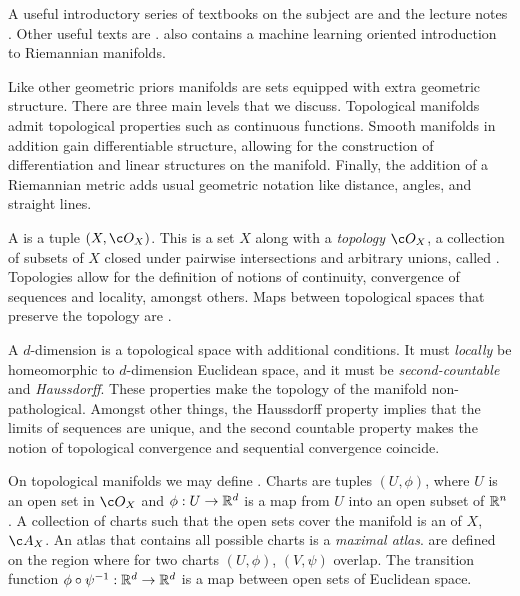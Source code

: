 A useful introductory series of textbooks on the subject are \textcite{lee2010introduction,lee2013smooth,lee2006riemannian} and the lecture notes \textcite{schuller2013lectures}. Other useful texts are \textcite{kolar2013natural, thorne2000gravitation}. \textcite{bronstein2021geometric} also contains a machine learning oriented introduction to Riemannian manifolds.

Like other geometric priors manifolds are sets equipped with extra geometric structure.
There are three main levels that we discuss.
Topological manifolds admit topological properties such as continuous functions.
Smooth manifolds in addition gain differentiable structure, allowing for the construction of differentiation and linear structures on the manifold.
Finally, the addition of a Riemannian metric adds usual geometric notation like distance, angles, and straight lines.


A  is a tuple \((X, \topo{X})\). 
This is a set \(X\) along with a \emph{topology} \(\topo{X}\), a collection of subsets of \(X\) closed under pairwise intersections and arbitrary unions, called .
Topologies allow for the definition of notions of continuity, convergence of sequences and locality, amongst others.
Maps between topological spaces that preserve the topology are .

A \(d\)-dimension  is a topological space with additional conditions.
It must \emph{locally} be homeomorphic to \(d\)-dimension Euclidean space, and it must be \emph{second-countable} and \emph{Haussdorff}. 
These properties make the topology of the manifold non-pathological.
Amongst other things, the Haussdorff property implies that the limits of sequences are unique, and the second countable property makes the notion of topological convergence and sequential convergence coincide.

On topological manifolds we may define .
Charts are tuples \((U, \phi)\), where \(U\) is an open set in \(\topo{X}\) and \(\phi: U \to \mathbb{R}^d\) is a map from \(U\) into an open subset of \(\mathbb{R}^n\).
A collection of charts such that the open sets cover the manifold is an  of \(X\), \(\atlas{X}\).
An atlas that contains all possible charts is a \emph{maximal atlas}.
 are defined on the region where for two charts \((U, \phi)\), \((V, \psi)\) overlap.
The transition function \(\phi \circ \psi^{-1}:\mathbb{R}^d \to \mathbb{R}^d\) is a map between open sets of Euclidean space.

